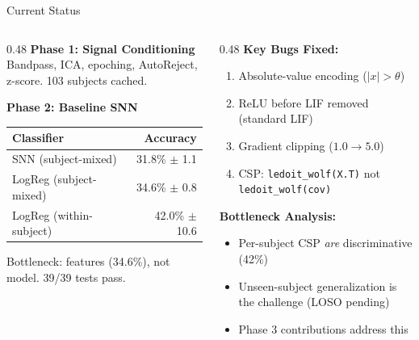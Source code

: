 \documentclass[10pt]{beamer}
\begin{document}
\begin{frame}{Current Status}

\begin{columns}[T]
\begin{column}{0.48\textwidth}
\footnotesize
\textbf{Phase 1: Signal Conditioning} \checkmark\\
Bandpass, ICA, epoching, AutoReject, z-score. 103 subjects cached.

\vspace{2pt}
\textbf{Phase 2: Baseline SNN} \checkmark\\
\begin{tabular}{lr}
\toprule
\textbf{Classifier} & \textbf{Accuracy} \\
\midrule
SNN (subject-mixed) & 31.8\% $\pm$ 1.1 \\
LogReg (subject-mixed) & 34.6\% $\pm$ 0.8 \\
LogReg (within-subject) & 42.0\% $\pm$ 10.6 \\
\bottomrule
\end{tabular}

\vspace{2pt}
Bottleneck: features (34.6\%), not model. 39/39 tests pass.
\end{column}
\begin{column}{0.48\textwidth}
\footnotesize
\textbf{Key Bugs Fixed:}
\begin{enumerate}
  \item Absolute-value encoding ($|x| > \theta$)
  \item ReLU before LIF removed (standard LIF)
  \item Gradient clipping ($1.0 \to 5.0$)
  \item CSP: \texttt{ledoit\_wolf(X.T)} not \texttt{ledoit\_wolf(cov)}
\end{enumerate}

\vspace{2pt}
\textbf{Bottleneck Analysis:}
\begin{itemize}
  \item Per-subject CSP \textit{are} discriminative (42\%)
  \item Unseen-subject generalization is the challenge (LOSO pending)
  \item Phase 3 contributions address this
\end{itemize}
\end{column}
\end{columns}

\end{frame}
\end{document}
